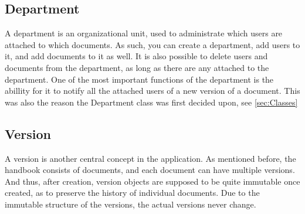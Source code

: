 \subsection{Department}
A department is an organizational unit, used to administrate which users are attached to which documents.
As such, you can create a department, add users to it, and add documents to it as well.
It is also possible to delete users and documents from the department, as long as there are any attached to the department.
One of the most important functions of the department is the abillity for it to notify all the attached users of a new version of a document.
This was also the reason the Department class was first decided upon, see \cref{sec:Classes}

\begin{figure}[H]
	\centering
{}
\end{figure} 

\subsection{Version}
A version is another central concept in the application.
As mentioned before, the handbook consists of documents, and each document can have multiple versions.
And thus, after creation, version objects are supposed to be quite immutable once created, as to preserve the history of individual documents.
Due to the immutable structure of the versions, the actual versions never change.


